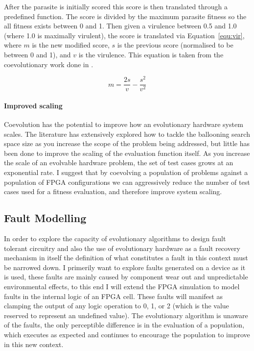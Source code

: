 After the parasite is initially scored this score is then translated through
a predefined function. The score is divided by the maximum parasite fitness so
the all fitness exists between 0 and 1. Then given a virulence
between 0.5 and 1.0 (where 1.0 is maximally virulent), the score is translated
via Equation~\ref{equ:vir}, where $m$ is the new modified score, $s$ is the
previous score (normalised to be between 0 and 1), and $v$ is the virulence.
This equation is taken from the coevolutionary work done in \cite{6790490}.

\begin{equation}
	\label{equ:vir}
	m = \frac{2s}{v} - \frac{s^2}{v^2}
\end{equation}

\paragraph{Improved scaling}
Coevolution has the potential to improve how an evolutionary hardware system scales.
The literature has extensively explored how to tackle the ballooning search space size
as you increase the scope of the problem being addressed, but little has been done
to improve the scaling of the evaluation function itself. As you increase the scale
of an evolvable hardware problem, the set of test cases grows at an exponential rate.
I suggest that by coevolving a population of problems against a population of FPGA
configurations we can aggressively reduce the number of test cases used for a fitness
evaluation, and therefore improve system scaling.

\subsection{Fault Modelling}
In order to explore the capacity of evolutionary algorithms to design fault
tolerant circuitry and also the use of evolutionary hardware as a fault
recovery mechanism in itself the definition of what constitutes a fault in
this context must be narrowed down. I primerily want to explore faults
generated on a device as it is used, these faults are mainly caused by
component wear out and unpredictable environmental effects, to
this end I will extend the FPGA simulation to model
faults in the internal logic of an FPGA cell. These faults will manifest as clamping
the output of any logic operation to 0, 1, or 2 (which is the value reserved to represent
an undefined value). The evolutionary algorithm is unaware of the
faults, the only perceptible difference is in the evaluation of a population,
which executes as expected and continues to encourage the population to improve in this
new context.

